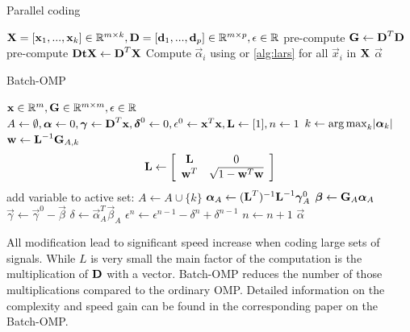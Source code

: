 \begin{algorithm}[H]
\caption{Parallel coding}
\label{alg:parallel}
\begin{algorithmic}[1]
\REQUIRE $\boldsymbol{\mathrm{X}} =[\boldsymbol{\mathrm{x}}_1,...,\boldsymbol{\mathrm{x}}_k]  \in \mathbb{R}^{m \times k},
\boldsymbol{\mathrm{D}} =[\boldsymbol{\mathrm{d}}_1,...,\boldsymbol{\mathrm{d}}_p] \in
\mathbb{R}^{m\times p}, \epsilon \in \mathbb{R}$
\STATE pre-compute $\boldsymbol{\mathrm{G}} \gets \boldsymbol{\mathrm{D}}^T\boldsymbol{\mathrm{D}}$
\STATE pre-compute $\boldsymbol{\mathrm{DtX}} \gets \boldsymbol{\mathrm{D}}^T\boldsymbol{\mathrm{X}}$
\STATE Compute $\vec{\alpha}_i$ using  or
\ref{alg:lars} for all $\vec{x}_i$ in $\boldsymbol{\mathrm{X}}$
\ENDFOR
\RETURN $\vec{\alpha}$
\end{algorithmic}
\end{algorithm}

\begin{algorithm}[H]
\caption{Batch-OMP}
\label{alg:batchOMP}
\begin{algorithmic}[1]
\REQUIRE $\boldsymbol{\mathrm{x}} \in \mathbb{R}^{m}, \boldsymbol{\mathrm{G}}  \in
\mathbb{R}^{m\times m}, \epsilon \in \mathbb{R}$
\STATE $A \gets \emptyset,\boldsymbol{\mathrm{\alpha}} \gets 0,\boldsymbol{\mathrm{\gamma}} \gets
\boldsymbol{\mathrm{D}}^T\boldsymbol{\mathrm{x}},\boldsymbol{\mathrm{\delta}}^0 \gets
0, \epsilon^0\gets \boldsymbol{\mathrm{x}}^T\boldsymbol{\mathrm{x}},\boldsymbol{\mathrm{L}}\gets[1],n\gets1$
\STATE $k \gets \operatorname*{arg\,max}_k\lvert \boldsymbol{\mathrm{\alpha}}_k \rvert$
\STATE $\boldsymbol{\mathrm{w}} \gets \boldsymbol{\mathrm{L}}^{-1}\boldsymbol{\mathrm{G}}_{A,k}$
\STATE
\begin{align}
\boldsymbol{\mathrm{L}} \gets \left[
\begin{array}{ccc}
\boldsymbol{\mathrm{L}} & 0\\
\boldsymbol{\mathrm{w}}^T & \sqrt{1-\boldsymbol{\mathrm{w}}^T\boldsymbol{\mathrm{w}}}
\end{array}
\right]
\end{align}
\ENDIF
\STATE add variable to active set: $A \gets A \cup \{ k\}$
\STATE $\boldsymbol{\mathrm{\alpha}}_A \gets (\boldsymbol{\mathrm{L}}^T)^{-1}\boldsymbol{\mathrm{L}}^{-1}\boldsymbol{\mathrm{\gamma}}_A^0$
\STATE $\boldsymbol{\mathrm{\beta}} \gets \boldsymbol{\mathrm{G}}_A\boldsymbol{\mathrm{\alpha}}_A$
\STATE $\vec{\gamma} \gets \vec{\gamma}^0-\vec{\beta}$
\STATE $\delta \gets \vec{\alpha}_A^T\vec{\beta}_A$
\STATE $\epsilon^n \gets \epsilon^{n-1} - \delta^n + \delta^{n-1}$
\STATE $n \gets n+1$
\ENDWHILE
\RETURN $\vec{\alpha}$
\end{algorithmic}
\end{algorithm}

All modification lead to significant speed increase when coding large sets of
signals. While $L$ is very small the main factor of the computation is
the multiplication of $\boldsymbol{\mathrm{D}}$ with a vector. Batch-OMP reduces the number of
those multiplications compared to the ordinary OMP. Detailed information on the
complexity and speed gain can be found in the corresponding
paper\cite{Rubinstein2008} on the Batch-OMP. 

